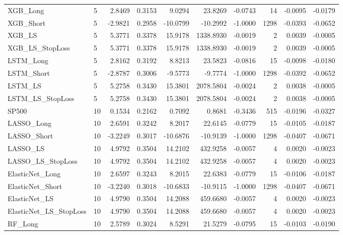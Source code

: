 \begin{tabular}{llrrrrrrrr}
\cline{1-10}
XGB\_Long & 5 & 2.8469 & 0.3153 & 9.0294 & 23.8269 & -0.0743 & 14 & -0.0095 & -0.0179 \\
\cline{1-10}
XGB\_Short & 5 & -2.9821 & 0.2958 & -10.0799 & -10.2992 & -1.0000 & 1298 & -0.0393 & -0.0652 \\
\cline{1-10}
XGB\_LS & 5 & 5.3771 & 0.3378 & 15.9178 & 1338.8930 & -0.0019 & 2 & 0.0039 & -0.0005 \\
\cline{1-10}
XGB\_LS\_StopLoss & 5 & 5.3771 & 0.3378 & 15.9178 & 1338.8930 & -0.0019 & 2 & 0.0039 & -0.0005 \\
\cline{1-10}
LSTM\_Long & 5 & 2.8162 & 0.3192 & 8.8213 & 23.5823 & -0.0816 & 15 & -0.0098 & -0.0180 \\
\cline{1-10}
LSTM\_Short & 5 & -2.8787 & 0.3006 & -9.5773 & -9.7774 & -1.0000 & 1298 & -0.0392 & -0.0652 \\
\cline{1-10}
LSTM\_LS & 5 & 5.2758 & 0.3430 & 15.3801 & 2078.5804 & -0.0024 & 2 & 0.0038 & -0.0005 \\
\cline{1-10}
LSTM\_LS\_StopLoss & 5 & 5.2758 & 0.3430 & 15.3801 & 2078.5804 & -0.0024 & 2 & 0.0038 & -0.0005 \\
\cline{1-10}
SP500 & 10 & 0.1534 & 0.2162 & 0.7092 & 0.8681 & -0.3436 & 515 & -0.0196 & -0.0327 \\
\cline{1-10}
LASSO\_Long & 10 & 2.6591 & 0.3242 & 8.2017 & 22.6145 & -0.0779 & 15 & -0.0105 & -0.0187 \\
\cline{1-10}
LASSO\_Short & 10 & -3.2249 & 0.3017 & -10.6876 & -10.9139 & -1.0000 & 1298 & -0.0407 & -0.0671 \\
\cline{1-10}
LASSO\_LS & 10 & 4.9792 & 0.3504 & 14.2102 & 432.9258 & -0.0057 & 4 & 0.0020 & -0.0023 \\
\cline{1-10}
LASSO\_LS\_StopLoss & 10 & 4.9792 & 0.3504 & 14.2102 & 432.9258 & -0.0057 & 4 & 0.0020 & -0.0023 \\
\cline{1-10}
ElasticNet\_Long & 10 & 2.6597 & 0.3243 & 8.2015 & 22.6383 & -0.0779 & 15 & -0.0106 & -0.0187 \\
\cline{1-10}
ElasticNet\_Short & 10 & -3.2240 & 0.3018 & -10.6833 & -10.9115 & -1.0000 & 1298 & -0.0407 & -0.0671 \\
\cline{1-10}
ElasticNet\_LS & 10 & 4.9790 & 0.3504 & 14.2088 & 459.6680 & -0.0057 & 4 & 0.0020 & -0.0023 \\
\cline{1-10}
ElasticNet\_LS\_StopLoss & 10 & 4.9790 & 0.3504 & 14.2088 & 459.6680 & -0.0057 & 4 & 0.0020 & -0.0023 \\
\cline{1-10}
RF\_Long & 10 & 2.5789 & 0.3024 & 8.5291 & 21.5279 & -0.0795 & 15 & -0.0103 & -0.0190 \\

\end{tabular}
